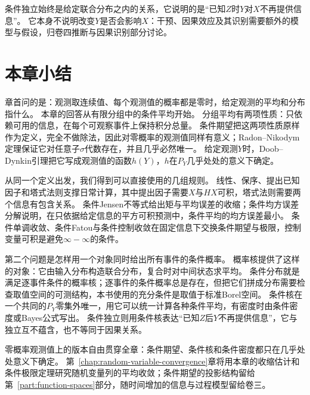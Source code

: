 条件独立始终是给定联合分布之内的关系，它说明的是“已知$Z$时$Y$对$X$不再提供信息”。
它本身不说明改变$Y$是否会影响$X$：干预、因果效应及其识别需要额外的模型与假设，归卷四推断与因果识别部分讨论。

\section{本章小结}
\label{sec:cond-summary}

章首问的是：观测取连续值、每个观测值的概率都是零时，给定观测的平均和分布指什么。
本章的回答从有限分组中的条件平均开始。
分组平均有两项性质：只依赖可用的信息，在每个可观察事件上保持积分总量。
条件期望把这两项性质原样作为定义，完全不做除法，因此对零概率的观测值同样有意义；Radon--Nikodym定理保证它对任意子$\sigma$代数存在，并且几乎必然唯一。
给定观测$Y$时，Doob--Dynkin引理把它写成观测值的函数$h(Y)$，$h$在$P_Y$几乎处处的意义下确定。

从同一个定义出发，我们得到可以直接使用的几组规则。
线性、保序、提出已知因子和塔式法则支撑日常计算，其中提出因子需要$X$与$HX$可积，塔式法则需要两个信息有包含关系。
条件Jensen不等式给出矩与平均误差的收缩；条件均方误差分解说明，在只依据给定信息的平方可积预测中，条件平均的均方误差最小。
条件单调收敛、条件Fatou与条件控制收敛在固定信息下交换条件期望与极限，控制变量可积是避免$\infty-\infty$的条件。

第二个问题是怎样用一个对象同时给出所有事件的条件概率。
概率核提供了这样的对象：它由输入分布构造联合分布，复合时对中间状态求平均。
条件分布就是满足逐事件条件的概率核；逐事件的条件概率总是存在，但把它们拼成分布需要检查取值空间的可测结构，本书使用的充分条件是取值于标准Borel空间。
条件核在一个共同的$P_Y$零集外唯一，用它可以统一计算各种条件平均，有密度时由条件密度或Bayes公式写出。
条件独立则用条件核表达“已知$Z$后$Y$不再提供信息”，它与独立互不蕴含，也不等同于因果关系。

零概率观测值上的版本自由贯穿全章：条件期望、条件核和条件密度都只在几乎处处意义下确定。
第~\ref{chap:random-variable-convergence}章将用本章的收缩估计和条件极限定理研究随机变量列的平均收敛；条件期望的投影结构留给第~\ref{part:function-spaces}部分，随时间增加的信息与过程模型留给卷三。

